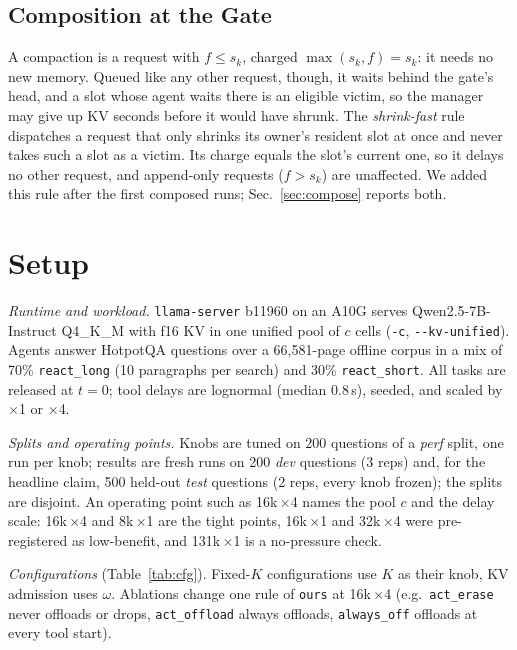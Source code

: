 \documentclass[conference]{IEEEtran}
\newcommand{\K}{$K$}
\newcommand{\x}{$\times$}
\newcommand{\cfg}[1]{\texttt{#1}}
\begin{document}
\subsection{Composition at the Gate}\label{sec:sf}
A compaction is a request with $f\le s_k$, charged $\max(s_k,f)=s_k$: it needs no new memory. Queued
like any other request, though, it waits behind the gate's head, and a slot whose agent waits there is
an eligible victim, so the manager may give up KV seconds before it would have shrunk. The
\emph{shrink-fast} rule dispatches a request that only shrinks its owner's resident slot at once and
never takes such a slot as a victim. Its charge equals the slot's current one, so it delays no other
request, and append-only requests ($f>s_k$) are unaffected. We added this rule after the first
composed runs; Sec.~\ref{sec:compose} reports both.

\section{Setup}\label{sec:setup}

\emph{Runtime and workload.} \texttt{llama-server} b11960 on an A10G serves Qwen2.5-7B-Instruct
Q4\_K\_M with f16 KV in one unified pool of $c$ cells (\texttt{-c}, \texttt{-{}-kv-unified}).
Agents answer HotpotQA questions over a 66,581-page offline corpus in a mix of 70\%
\texttt{react\_long} (10 paragraphs per search) and 30\% \texttt{react\_short}. All tasks are released
at $t=0$; tool delays are lognormal (median 0.8\,s), seeded, and scaled by \x1 or \x4.

\emph{Splits and operating points.} Knobs are tuned on 200 questions of a \emph{perf} split, one run
per knob; results are fresh runs on 200 \emph{dev} questions (3 reps) and, for the headline claim, 500
held-out \emph{test} questions (2 reps, every knob frozen); the splits are disjoint. An operating
point such as 16k\,\x4 names the pool $c$ and the delay scale: 16k\,\x4 and 8k\,\x1 are the tight
points, 16k\,\x1 and 32k\,\x4 were pre-registered as low-benefit, and 131k\,\x1 is a no-pressure check.

\emph{Configurations} (Table~\ref{tab:cfg}). Fixed-\K{} configurations use \K{} as their knob, KV
admission uses $\omega$. Ablations change one rule of \cfg{ours} at 16k\,\x4 (e.g.\ \cfg{act\_erase}
never offloads or drops, \cfg{act\_offload} always offloads, \cfg{always\_off} offloads at every tool
start).
\end{document}
